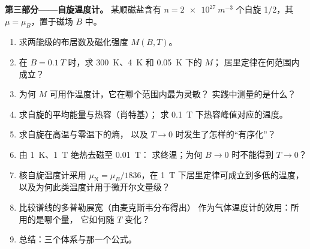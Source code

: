 \begin{problem}
\textbf{第三部分——自旋温度计。}
某顺磁盐含有 $n = \qty{2e27}{m^{-3}}$ 个自旋 1/2，其 $\mu
= \mu_B$，置于磁场 $B$ 中。
\begin{enumerate}[resume]
  \item 求两能级的布居数及磁化强度
        $M(B,T)$。
  \item 在 $B = \qty{0.1}{T}$ 时，求 \qty{300}{K}、\qty{4}{K} 和 \qty{0.05}{K} 下的 $M$；
        居里定律在何范围内成立？
  \item 为何 $M$ 可用作温度计，它在哪个范围内最为灵敏？
        实践中测量的是什么？
  \item 求自旋的平均能量与热容（肖特基）；
        求 \qty{0.1}{T} 下热容峰值对应的温度。
  \item 求自旋在高温与零温下的熵，
        以及 $T \to 0$ 时发生了怎样的“有序化”？
  \item 由 \qty{1}{K}、\qty{1}{T} 绝热去磁至 \qty{0.01}{T}：
        求终温；为何 $B \to 0$ 时不能得到 $T \to 0$？
  \item 核自旋温度计采用 $\mu_{\text{N}} = \mu_B/1836$，在
        \qty{1}{T} 下居里定律可成立到多低的温度，
        以及为何此类温度计用于微开尔文量级？
  \item 比较谱线的多普勒展宽（由麦克斯韦分布得出）
        作为气体温度计的效用：所用的是哪个量，
        它如何随 $T$ 变化？
  \item 总结：三个体系与那一个公式。
\end{enumerate}
\end{problem}
